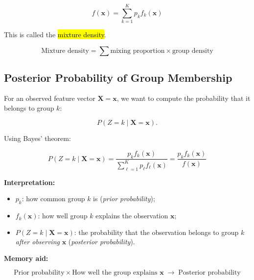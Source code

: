 $$
\boxed{
f(\mathbf{x})
=
\sum_{k=1}^K p_k f_k(\mathbf{x})
}
$$

This is called the \hl{mixture density}.

$$
\boxed{
\text{Mixture density}
=
\sum
\text{mixing proportion}
\times
\text{group density}
}
$$

\subsection{Posterior Probability of Group Membership}

For an observed feature vector $\bm{X}=\mathbf{x}$, we want to compute the
probability that it belongs to group $k$:

$$
P(Z=k\mid \bm{X}=\mathbf{x}).
$$

Using Bayes' theorem:

$$
\boxed{
P(Z=k\mid \bm{X}=\mathbf{x})
=
\frac{p_kf_k(\mathbf{x})}
{\displaystyle\sum_{\ell=1}^K p_\ell f_\ell(\mathbf{x})}
=
\frac{p_kf_k(\mathbf{x})}{f(\mathbf{x})}
}
$$

\textbf{Interpretation:}
\begin{itemize}
\item $p_k$: how common group $k$ is (\textit{prior probability});
\item $f_k(\mathbf{x})$: how well group $k$ explains the observation
$\mathbf{x}$;
\item $P(Z=k\mid\bm{X}=\mathbf{x})$: the probability that the observation
belongs to group $k$ \emph{after observing} $\mathbf{x}$ (\textit{posterior
probability}).
\end{itemize}

\textbf{Memory aid:}

$$
\boxed{
\text{Prior probability}
\times
\text{How well the group explains }\mathbf{x}
\;\longrightarrow\;
\text{Posterior probability}
}
$$